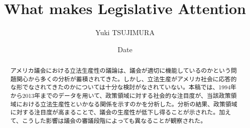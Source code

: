 \documentclass[here]{article}
\title{What makes Legislative Attention}
\author{Yuki TSUJIMURA}
\date{Date}
\begin{document}
\maketitle

\begin{abstract}
アメリカ議会における立法生産性の議論は、議会が適切に機能しているのかという問題関心から多くの分析が蓄積されてきた。しかし、立法生産がアメリカ社会に応答的な形でなされてきたのかについては十分な検討がなされていない。本稿では、1994年から2013年までのデータを用いて、政策領域に対する社会的な注目度が、当該政策領域における立法生産性といかなる関係を示すのかを分析した。分析の結果、政策領域に対する注目度が高まることで、議会の生産性が低下し得ることが示された。加えて、こうした影響は議会の審議段階によっても異なることが観察された。
\end{abstract}
\end{document}
